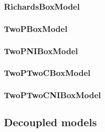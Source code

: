 \subsubsection{RichardsBoxModel} 


\subsubsection{TwoPBoxModel} 


\subsubsection{TwoPNIBoxModel} 


\subsubsection{TwoPTwoCBoxModel} 


\subsubsection{TwoPTwoCNIBoxModel} 



\subsection{Decoupled models} 






